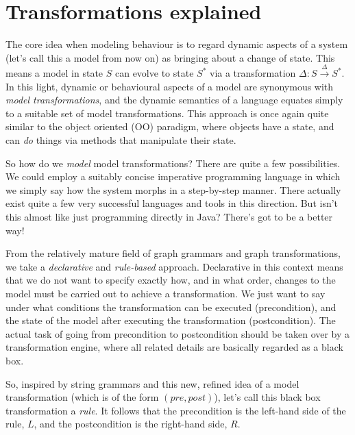 \newpage
\hypertarget{explanation}{}
\chapter{Transformations explained}
\genHeader

The core idea when modeling behaviour is to regard dynamic aspects of a system (let's call this a model from now on) as bringing about a change of state.
This means a model in state $S$ can evolve to state $S^*$ via a transformation $\Delta: S \stackrel{\Delta}{\rightarrow}S^*$. In this light, dynamic or
behavioural aspects of a model are synonymous with \emph{model transformations}, and the dynamic semantics of a language equates simply to a suitable set of
model transformations. This approach is once again quite similar to the object oriented (OO) paradigm, where objects have a state, and can \emph{do} things via
methods that manipulate their state.

So how do we \emph{model} model transformations?  There are quite a few possibilities. We could employ a suitably concise imperative programming language in
which we simply say how the system morphs in a step-by-step manner. There actually exist quite a few very successful languages and tools in this direction. But
isn't this almost like just programming directly in Java? There's got to be a better way! 

From the relatively mature field of graph grammars and graph transformations, we take a \emph{declarative} and \emph{rule-based} approach. Declarative in this
context means that we do not want to specify exactly how, and in what order, changes to the model must be carried out to achieve a transformation. We just want
to say under what conditions the transformation can be executed (precondition), and the state of the model after executing the transformation (postcondition).
The actual task of going from precondition to postcondition should be taken over by a transformation engine, where all related details are basically regarded as
a black box.

So, inspired by string grammars and this new, refined idea of a model transformation (which is of the form $(pre, post)$), let's call this black box
transformation a \emph{rule}. It follows that the precondition is the left-hand side of the rule, $L$, and the postcondition is the right-hand side, $R$.

